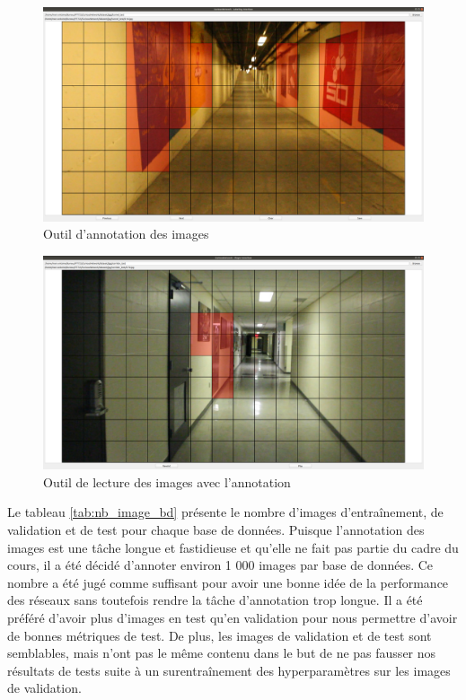     \begin{figure}
        \centering
        \includegraphics[width=15cm]{images/outil_annotation.png}
        \caption{Outil d'annotation des images}
        \label{fig:outil_annotation}
    \end{figure}

    \begin{figure}
        \centering
        \includegraphics[width=15cm]{images/outil_lecture.png}
        \caption{Outil de lecture des images avec l'annotation}
        \label{fig:outil_lecture}
    \end{figure}

    Le tableau \ref{tab:nb_image_bd} présente le nombre d'images d'entraînement, de validation et de test pour chaque base de données. Puisque l'annotation des images est une tâche longue et fastidieuse et qu'elle ne fait pas partie du cadre du cours, il a été décidé d'annoter environ 1 000 images par base de données. Ce nombre a été jugé comme suffisant pour avoir une bonne idée de la performance des réseaux sans toutefois rendre la tâche d'annotation trop longue. Il a été préféré d'avoir plus d'images en test qu'en validation pour nous permettre d'avoir de bonnes métriques de test. De plus, les images de validation et de test sont semblables, mais n'ont pas le même contenu dans le but de ne pas fausser nos résultats de tests suite à un surentraînement des hyperparamètres sur les images de validation. 
    
